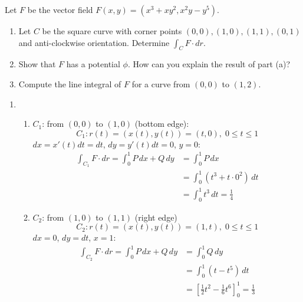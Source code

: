 \begin{exercise}
	Let $F$ be the vector field $F(x,y) = (x^3 + xy^2, x^2 y - y^5)$.
	\begin{enumerate}
		\item Let $C$ be the square curve with corner points $(0,0), (1,0), (1,1), (0,1)$ and anti-clockwise orientation. Determine $\int_C F \cdot dr$.

		\item Show that $F$ has a potential $\phi$. How can you explain the result of part (a)?

		\item Compute the line integral of $F$ for a curve from $(0,0)$ to $(1,2)$.
	\end{enumerate}
\end{exercise}

\begin{solution}
	\begin{enumerate}
		\item
		      \begin{enumerate}[label=\arabic*.]
			      \item $C_1$: from $(0,0)$ to $(1,0)$ (bottom edge):
			            $$
				            C_1: r(t) = (x(t),y(t)) = (t,0), \; 0 \le t \le 1
			            $$
			            $dx = x'(t)dt = dt$, $dy = y'(t)dt = 0$, $y = 0$:
			            $$
				            \begin{aligned}
					            \int_{C_1} F \cdot dr = \int_{0}^{1} P\,dx + Q\,dy & = \int_{0}^{1} P\,dx                                   \\
					                                                               & = \int_{0}^{1} \left( t^{3} + t \cdot 0^2 \right) \,dt \\
					                                                               & = \int_{0}^{1} t^{3}\,dt = \frac{1}{4}
				            \end{aligned}
			            $$
			      \item $C_2$: from $(1,0)$ to $(1,1)$ (right edge)
			            $$
				            C_2: r(t) = (x(t),y(t)) = (1,t), \; 0 \le t \le 1
			            $$
			            $dx = 0$, $dy = dt$, $x = 1$:
			            $$
				            \begin{aligned}
					            \int_{C_2} F \cdot dr = \int_{0}^{1} P\,dx + Q\,dy & = \int_{0}^{1} Q\,dy                                                         \\
					                                                               & = \int_{0}^{1} (t - t^{5})\,dt                                               \\
					                                                               & = \left[ \tfrac{1}{2}t^{2} - \tfrac{1}{6}t^{6} \right]_{0}^{1} = \frac{1}{3}
				            \end{aligned}
			            $$


\end{enumerate}
\end{enumerate}
\end{solution}
